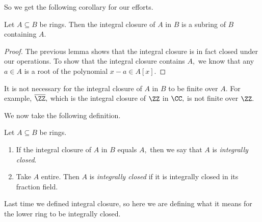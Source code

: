 So we get the following corollary for our efforts.
\begin{thm}
    Let $A\subseteq B$ be rings. Then the integral closure of $A$ in $B$ is a subring of $B$ containing $A.$
\end{thm}
\begin{proof}
    The previous lemma shows that the integral closure is in fact closed under our operations. To show that the integral closure contains $A,$ we know that any $a\in A$ is a root of the polynomial $x-a\in A[x].$
\end{proof}
\begin{remark}
    It is not necessary for the integral closure of $A$ in $B$ to be finite over $A.$ For example, $\overline\ZZ,$ which is the integral closure of $\ZZ$ in $\CC,$ is not finite over $\ZZ.$
\end{remark}

We now take the following definition.
\begin{defi}
    Let $A\subseteq B$ be rings.
    \begin{enumerate}[label=(\alph*)]
        \item If the integral closure of $A$ in $B$ equals $A,$ then we say that $A$ is \textit{integrally closed}.
        \item Take $A$ entire. Then $A$ is \textit{integrally closed} if it is integrally closed in its fraction field.
    \end{enumerate}
\end{defi}
Last time we defined integral closure, so here we are defining what it means for the lower ring to be integrally closed.

